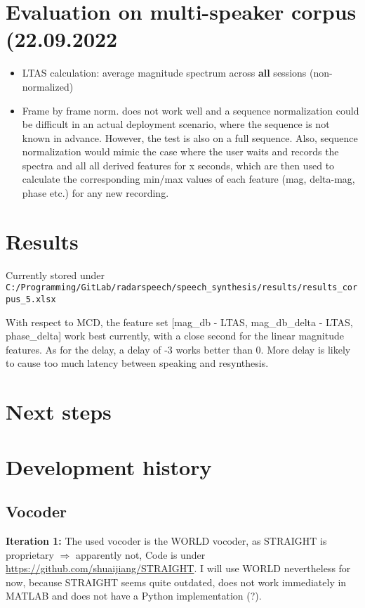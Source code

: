 \documentclass{article}
\begin{document}
\section{Evaluation on multi-speaker corpus (22.09.2022}

\begin{itemize}
\item LTAS calculation: average magnitude spectrum across \textbf{all} sessions (non-normalized)
\item Frame by frame norm. does not work well and a sequence normalization could be difficult in an actual deployment scenario, where the sequence is not known in advance. However, the test is also on a full sequence. Also, sequence normalization would mimic the case where the user waits and records the spectra and all all derived features for x seconds, which are then used to calculate the corresponding min/max values of each feature (mag, delta-mag, phase etc.) for any new recording. 
\end{itemize}

\section{Results}
Currently stored under 
\texttt{C:/Programming/GitLab/radarspeech/speech\_synthesis/results/results\_corpus\_5.xlsx}

With respect to MCD, the feature set [mag\_db - LTAS, mag\_db\_delta - LTAS, phase\_delta] work best currently, with a close second for the linear magnitude features. As for the delay, a delay of -3 works better than 0. More delay is likely to cause too much latency between speaking and resynthesis.

\section{Next steps}


\section{Development history}

\subsection{Vocoder}
\textbf{Iteration 1:} 
The used vocoder is the WORLD vocoder, as STRAIGHT is proprietary $\Rightarrow$ apparently not, Code is under \url{https://github.com/shuaijiang/STRAIGHT}. I will use WORLD nevertheless for now, because STRAIGHT seems quite outdated, does not work immediately in MATLAB and does not have a Python implementation (?).
\end{document}
